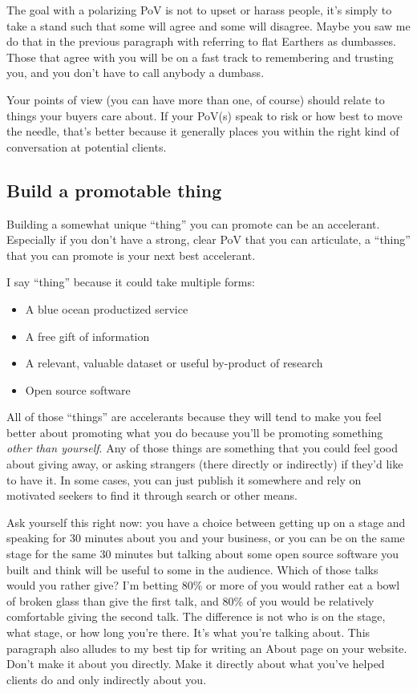 The goal with a polarizing PoV is not to upset or harass people, it’s simply to take a stand such that some will agree and some will disagree. Maybe you saw me do that in the previous paragraph with referring to flat Earthers as dumbasses. Those that agree with you will be on a fast track to remembering and trusting you, and you don’t have to call anybody a dumbass.

Your points of view (you can have more than one, of course) should relate to things your buyers care about. If your PoV(s) speak to risk or how best to move the needle, that’s better because it generally places you within the right kind of conversation at potential clients.

\subsection{Build a promotable thing}

Building a somewhat unique “thing” you can promote can be an accelerant. Especially if you don’t have a strong, clear PoV that you can articulate, a “thing” that you can promote is your next best accelerant.

I say “thing” because it could take multiple forms:

\begin{itemize}
\item A blue ocean productized service
\item A free gift of information
\item A relevant, valuable dataset or useful by-product of research
\item Open source software
\end{itemize}

All of those “things” are accelerants because they will tend to make you feel better about promoting what you do because you’ll be promoting something \emph{other than yourself}.  Any of those things are something that you could feel good about giving away, or asking strangers (there directly or indirectly) if they’d like to have it. In some cases, you can just publish it somewhere and rely on motivated seekers to find it through search or other means.

Ask yourself this right now: you have a choice between getting up on a stage and speaking for 30 minutes about you and your business, or you can be on the same stage for the same 30 minutes but talking about some open source software you built and think will be useful to some in the audience. Which of those talks would you rather give? I’m betting 80\% or more of you would rather eat a bowl of broken glass than give the first talk, and 80\% of you would be relatively comfortable giving the second talk. The difference is not who is on the stage, what stage, or how long you’re there. It’s what you’re talking about. This paragraph also alludes to my best tip for writing an About page on your website. Don’t make it about you directly. Make it directly about what you’ve helped clients do and only indirectly about you.

